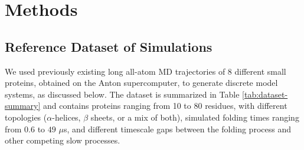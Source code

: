 \section{\label{sec:methods}Methods}


\subsection{\label{sec:methods-dataset}Reference Dataset of Simulations}

We used previously existing long all-atom MD trajectories
of 8 different small proteins\cite{lindorff2011}, obtained on the Anton supercomputer, to generate
discrete model systems, as discussed below. The dataset is summarized in Table
\ref{tab:dataset-summary} and contains proteins ranging from 10 to 80 residues,
with different topologies ($\alpha$-helices, $\beta$ sheets, or a mix of both),
simulated folding times ranging from $0.6$ to $49$ $\mu$s, and different timescale gaps between
the folding process and other competing slow processes.

\begin{table}[!ht]
\centering
\caption{Previously simulated proteins used to generate discrete models in this study}
\label{tab:dataset-summary}
\end{table}

